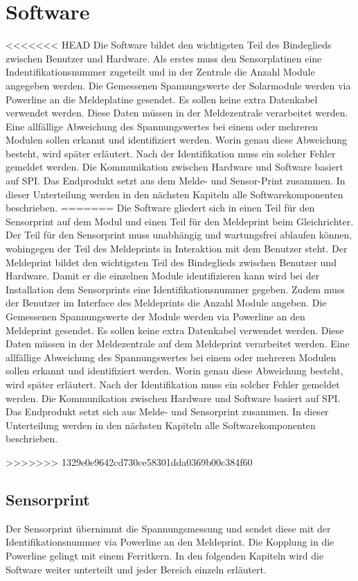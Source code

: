 \section{Software}
<<<<<<< HEAD
Die Software bildet den wichtigsten Teil des Bindeglieds zwischen Benutzer und Hardware. Als erstes muss den Sensorplatinen eine Indentifikationsnummer zugeteilt und in der Zentrale die Anzahl Module angegeben werden. Die Gemessenen Spannungswerte der Solarmodule werden via Powerline an die Meldeplatine gesendet. Es sollen keine extra Datenkabel verwendet werden. Diese Daten müssen in der Meldezentrale verarbeitet werden. Eine allfällige Abweichung des Spannungswertes bei einem oder mehreren Modulen sollen erkannt und identifiziert werden. Worin genau diese Abweichung besteht, wird später erläutert. Nach der Identifikation muss ein solcher Fehler gemeldet werden. Die Kommunikation zwischen Hardware und Software basiert auf SPI. Das Endprodukt setzt aus dem Melde- und Sensor-Print zusammen. In dieser Unterteilung werden in den nächsten Kapiteln alle Softwarekomponenten beschrieben.
=======
Die Software gliedert sich in einen Teil für den Sensorprint auf dem Modul und einen Teil für den Meldeprint beim Gleichrichter. Der Teil für den Sensorprint muss unabhängig und wartungsfrei ablaufen können, wohingegen der Teil des Meldeprints in Interaktion mit dem Benutzer steht. Der Meldeprint bildet den wichtigsten Teil des Bindeglieds zwischen Benutzer und Hardware. Damit er die einzelnen Module identifizieren kann wird bei der Installation dem Sensorprints eine Identifikationsnummer gegeben. Zudem muss der Benutzer im Interface des Meldeprints die Anzahl Module angeben. Die Gemessenen Spannungswerte der Module werden via Powerline an den Meldeprint gesendet. Es sollen keine extra Datenkabel verwendet werden. Diese Daten müssen in der Meldezentrale auf dem Meldeprint verarbeitet werden. Eine allfällige Abweichung des Spannungswertes bei einem oder mehreren Modulen sollen erkannt und identifiziert werden. Worin genau diese Abweichung besteht, wird später erläutert. Nach der Identifikation muss ein solcher Fehler gemeldet werden. Die Kommunikation zwischen Hardware und Software basiert auf SPI. Das Endprodukt setzt sich aus Melde- und Sensorprint zusammen. In dieser Unterteilung werden in den nächsten Kapiteln alle Softwarekomponenten beschrieben.






>>>>>>> 1329e0e9642cd730ce58301dda0369b00c384f60
\subsection{Sensorprint}
Der Sensorprint übernimmt die Spannungsmessung und sendet diese mit der Identifikationsnummer via Powerline an den Meldeprint. Die Kopplung in die Powerline gelingt mit einem Ferritkern. In den folgenden Kapiteln wird die Software weiter unterteilt und jeder Bereich einzeln erläutert.
